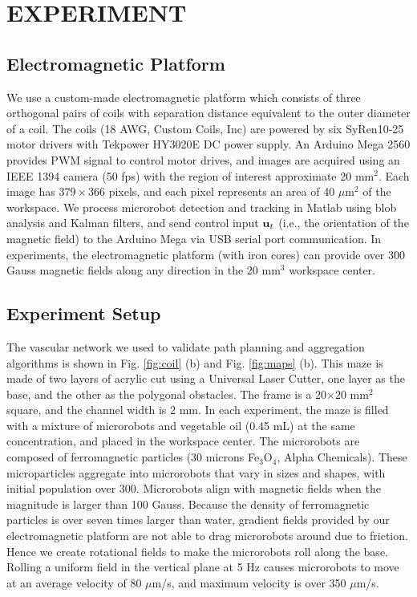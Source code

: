 \section{EXPERIMENT}\label{Experiment}

\subsection{Electromagnetic Platform}
We use a custom-made electromagnetic platform which consists of three orthogonal pairs of coils with separation distance equivalent to the outer diameter of a coil. 
The coils (18 AWG, Custom Coils, Inc) are powered by six SyRen10-25 motor drivers with Tekpower HY3020E DC power supply. 
An Arduino Mega 2560 provides PWM signal to control motor drives, and images are acquired using an IEEE 1394 camera (50 fps) with the region of interest approximate 20 mm$^2$. 
Each image has $379\times366$ pixels, and each pixel represents an area of 40 $\mu$m$^2$ of the workspace.  
We process microrobot detection and tracking in {\sc Matlab} using blob analysis and Kalman filters, and send control input ${\bf u}_t$ (i.e., the orientation of the magnetic field) to the Arduino Mega via USB serial port communication. 
In experiments, the electromagnetic platform (with iron cores) can provide over 300 Gauss magnetic fields along any direction in the 20 mm$^3$ workspace center.    

\subsection{Experiment Setup}
The vascular network we used to validate path planning and aggregation algorithms is shown in Fig. \ref{fig:coil} (b) and Fig. \ref{fig:maps} (b). This maze is made of two layers of acrylic cut using a Universal Laser Cutter, one layer as the base, and the other as the polygonal obstacles. %
The frame is a 20$\times$20 mm$^2$ square, and the channel width is 2 mm. 
In each experiment, the maze is filled with a mixture of microrobots and vegetable oil (0.45 mL) at the same concentration, and placed in the workspace center.
The microrobots are composed of ferromagnetic particles (30 microns Fe$_3$O$_4$, Alpha Chemicals). 
These microparticles aggregate into microrobots that  vary in sizes and shapes, with initial population over 300. 
Microrobots align with magnetic fields when the magnitude is larger than 100 Gauss. 
Because the density of ferromagnetic particles is over seven times larger than water, gradient fields provided by our electromagnetic platform are not able to drag microrobots around due to friction.
 Hence we create rotational fields to make the microrobots roll along the base.   
 Rolling a uniform field in the vertical plane at 5 Hz causes microrobots to move at an average velocity of 80 $\mu$m/s, and maximum velocity is over 350 $\mu$m/s.



